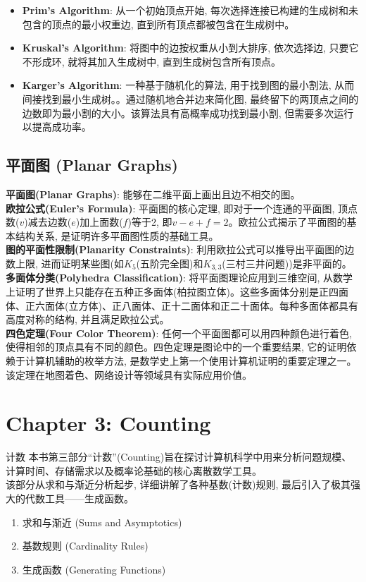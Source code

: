 \documentclass[12pt, a4paper, UTF8]{ctexart}
\newcommand{\term}[1]{\textbf{\textcolor{blue!80!black}{#1}}}
\newcommand{\emphb}[1]{\textbf{#1}}
\begin{document}
\begin{sloppypar}
\begin{itemize}[nosep]
        \item \term{Prim's Algorithm}: 从一个初始顶点开始, 每次选择连接已构建的生成树和未包含的顶点的最小权重边, 直到所有顶点都被包含在生成树中。
        \item \term{Kruskal's Algorithm}: 将图中的边按权重从小到大排序, 依次选择边, 只要它不形成环, 就将其加入生成树中, 直到生成树包含所有顶点。
        \item \term{Karger's Algorithm}: 一种基于随机化的算法, 用于找到图的最小割法, 从而间接找到最小生成树。。通过随机地合并边来简化图, 最终留下的两顶点之间的边数即为最小割的大小。该算法具有高概率成功找到最小割, 但需要多次运行以提高成功率。
    \end{itemize}

    \subsection{平面图 (Planar Graphs)}
    \term{平面图(Planar Graphs)}: 能够在二维平面上画出且边不相交的图。\\
    \term{欧拉公式(Euler's Formula)}: 平面图的核心定理, 即对于一个连通的平面图, 顶点数($v$)减去边数($e$)加上面数($f$)等于2, 即$v - e + f = 2$。欧拉公式揭示了平面图的基本结构关系, 是证明许多平面图性质的基础工具。\\
    \emphb{图的平面性限制(Planarity Constraints)}: 利用欧拉公式可以推导出平面图的边数上限, 进而证明某些图(如$K_5$(五阶完全图)和$K_{3,3}$(三村三井问题))是非平面的。\\
    \emphb{多面体分类(Polyhedra Classification)}: 将平面图理论应用到三维空间, 从数学上证明了世界上只能存在五种正多面体(柏拉图立体)。这些多面体分别是正四面体、正六面体(立方体)、正八面体、正十二面体和正二十面体。每种多面体都具有高度对称的结构, 并且满足欧拉公式。\\
    \term{四色定理(Four Color Theorem)}: 任何一个平面图都可以用四种颜色进行着色, 使得相邻的顶点具有不同的颜色。四色定理是图论中的一个重要结果, 它的证明依赖于计算机辅助的枚举方法, 是数学史上第一个使用计算机证明的重要定理之一。该定理在地图着色、网络设计等领域具有实际应用价值。
    \newpage

    \section{Chapter 3: Counting}
    \begin{chaptersummary}{计数}
        本书第三部分“计数”(Counting)旨在探讨计算机科学中用来分析问题规模、计算时间、存储需求以及概率论基础的核心离散数学工具。\\
        该部分从求和与渐近分析起步, 详细讲解了各种基数(计数)规则, 最后引入了极其强大的代数工具——生成函数。
        \tcbline %
        \begin{enumerate}[nosep]
            \item 求和与渐近 (Sums and Asymptotics)
            \item 基数规则 (Cardinality Rules)
            \item 生成函数 (Generating Functions)
        \end{enumerate}
    \end{chaptersummary}


\end{sloppypar}
\end{document}
